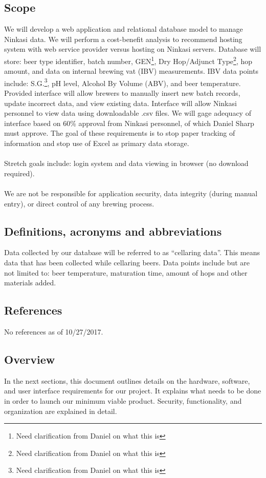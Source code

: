 \documentclass[draftclsnofoot,onecolumn,letterpaper,10pt,compsoc]{IEEEtran}
\begin{document}
	\subsection{Scope}
    We will develop a web application and relational database model to manage Ninkasi data. We will perform a cost-benefit analysis to recommend hosting system with web service provider versus hosting on Ninkasi servers. Database will store: beer type identifier, batch number, GEN\footnote{Need clarification from Daniel on what this is}, Dry Hop/Adjunct Type\footnote{Need clarification from Daniel on what this is}, hop amount, and data on internal brewing vat (IBV) measurements. IBV data points include: S.G.\footnote{Need clarification from Daniel on what this is}, pH level, Alcohol By Volume (ABV), and beer temperature. Provided interface will allow brewers to manually insert new batch records, update incorrect data, and view existing data. Interface will allow Ninkasi personnel to view data using downloadable .csv files. We will gage adequacy of interface based on 60\% approval from Ninkasi personnel, of which Daniel Sharp must approve. The goal of these requirements is to stop paper tracking of information and stop use of Excel as primary data storage.
    \\
    \\
    Stretch goals include: login system and data viewing in browser (no download required).
    \\
    \\
    We are not be responsible for application security, data integrity (during manual entry), or direct control of any brewing process.
    
	\subsection{Definitions, acronyms and abbreviations}
    Data collected by our database will be referred to as “cellaring data”. This means data that has been collected while cellaring beers. Data points include but are not limited to: beer temperature, maturation time, amount of hops and other materials added. 
    
	\subsection{References}
    No references as of 10/27/2017.
	\subsection{Overview}
    In the next sections, this document outlines details on the hardware, software, and user interface requirements for our project. It explains what needs to be done in order to launch our minimum viable product. Security, functionality, and organization are explained in detail.
\end{document}
